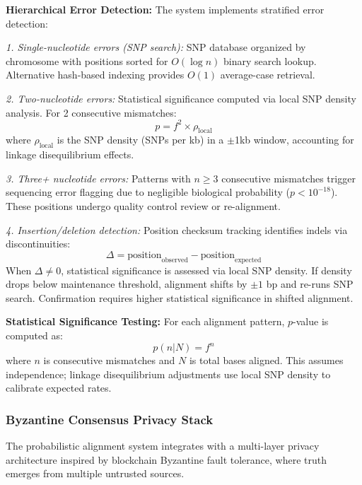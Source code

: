\documentclass[11pt,letterpaper]{article}
\begin{document}
\textbf{Hierarchical Error Detection:} The system implements stratified error detection:

\textit{1. Single-nucleotide errors (SNP search):} SNP database organized by chromosome with positions sorted for $O(\log n)$ binary search lookup. Alternative hash-based indexing provides $O(1)$ average-case retrieval.

\textit{2. Two-nucleotide errors:} Statistical significance computed via local SNP density analysis. For 2 consecutive mismatches:
\begin{equation}
p = f^2 \times \rho_{\text{local}}
\end{equation}
where $\rho_{\text{local}}$ is the SNP density (SNPs per kb) in a $\pm$1kb window, accounting for linkage disequilibrium effects.

\textit{3. Three+ nucleotide errors:} Patterns with $n \geq 3$ consecutive mismatches trigger sequencing error flagging due to negligible biological probability ($p < 10^{-18}$). These positions undergo quality control review or re-alignment.

\textit{4. Insertion/deletion detection:} Position checksum tracking identifies indels via discontinuities:
\begin{equation}
\Delta = \text{position}_{\text{observed}} - \text{position}_{\text{expected}}
\end{equation}
When $\Delta \neq 0$, statistical significance is assessed via local SNP density. If density drops below maintenance threshold, alignment shifts by $\pm 1$ bp and re-runs SNP search. Confirmation requires higher statistical significance in shifted alignment.

\textbf{Statistical Significance Testing:} For each alignment pattern, $p$-value is computed as:
\begin{equation}
p(n | N) = f^n
\end{equation}
where $n$ is consecutive mismatches and $N$ is total bases aligned. This assumes independence; linkage disequilibrium adjustments use local SNP density to calibrate expected rates.

\subsubsection{Byzantine Consensus Privacy Stack}

The probabilistic alignment system integrates with a multi-layer privacy architecture inspired by blockchain Byzantine fault tolerance, where truth emerges from multiple untrusted sources.
\end{document}
